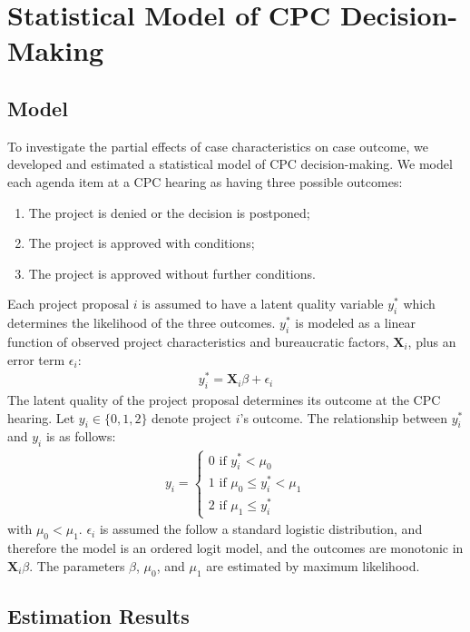\section{Statistical Model of CPC Decision-Making}\label{sec_methodology}

\subsection{Model}

To investigate the partial effects of case characteristics on case outcome, we developed and estimated a statistical model of CPC decision-making. We model each agenda item at a CPC hearing as having three possible outcomes:
\begin{enumerate}[start=0]
\item The project is denied or the decision is postponed;
\item The project is approved with conditions;
\item The project is approved without further conditions.
\end{enumerate}
Each project proposal $i$ is assumed to have a latent quality variable $y_i^\ast$ which determines the likelihood of the three outcomes. $y_i^\ast$ is modeled as a linear function of observed project characteristics and bureaucratic factors, $\mathbf{X}_i$, plus an error term $\epsilon_i$:
\begin{align}
y_i^\ast = \mathbf{X}_i \beta + \epsilon_i
\end{align}
The latent quality of the project proposal determines its outcome at the CPC hearing. Let $y_{i} \in \{0, 1, 2\}$ denote project $i$'s outcome. The relationship between $y_i^\ast$ and $y_i$ is as follows:
\begin{align}
y_i = \begin{cases}
0 \text{ if } y_i^\ast < \mu_0 \\
1 \text{ if } \mu_0 \leq y_i^\ast < \mu_1 \\
2 \text{ if } \mu_1 \leq y_i^\ast
\end{cases}
\end{align}
with $\mu_0 < \mu_1$. $\epsilon_{i}$ is assumed the follow a standard logistic distribution, and therefore the model is an ordered logit model, and the outcomes are monotonic in $\mathbf{X}_i \beta$. The parameters $\beta$, $\mu_0$, and $\mu_1$ are estimated by maximum likelihood.

\subsection{Estimation Results}

